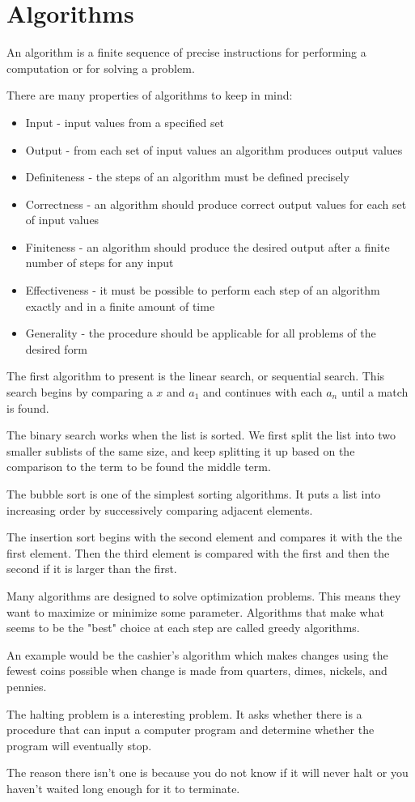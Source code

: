 \documentclass[../discrete.tex]{subfiles}
\begin{document}
\chapter{Algorithms}
An algorithm is a finite sequence of precise instructions for performing a computation
or for solving a problem.

There are many properties of algorithms to keep in mind:
\begin{itemize}
    \item Input - input values from a specified set
    \item Output - from each set of input values an algorithm produces output values
    \item Definiteness - the steps of an algorithm must be defined precisely
    \item Correctness - an algorithm should produce correct output values for each set of input values
    \item Finiteness - an algorithm should produce the desired output after a finite number of steps for any input
    \item Effectiveness - it must be possible to perform each step of an algorithm exactly and in a finite amount of time
    \item Generality - the procedure should be applicable for all problems of the desired form
\end{itemize}

The first algorithm to present is the linear search, or sequential search. This search begins by comparing a $x$ and $a_1$ and continues with each $a_n$ until a match is found.

The binary search works when the list is sorted. We first split the list into two smaller sublists of the same size, and keep splitting it up based on the comparison to the term to be found the middle term.

The bubble sort is one of the simplest sorting algorithms. It puts a list into increasing order by successively comparing adjacent elements. 

The insertion sort begins with the second element and compares it with the the first element. Then the third element is compared with the first and then the second if it is larger than the first. 

Many algorithms are designed to solve optimization problems. This means they want to maximize or minimize some parameter. 
Algorithms that make what seems to be the "best" choice at each step are called greedy algorithms. 

An example would be the cashier's algorithm which makes changes using the fewest coins possible when change is made from 
quarters, dimes, nickels, and pennies.

The halting problem is a interesting problem. It asks whether there is a procedure
that can input a computer program and determine whether the program will eventually stop.

The reason there isn't one is because you do not know if it will never halt or you haven't waited long enough for it to terminate.
\end{document}
